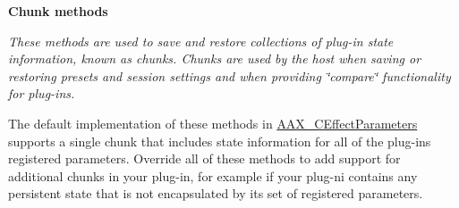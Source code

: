 \begin{Indent}{\bf Chunk methods}\par
{\em These methods are used to save and restore collections of plug-\/in state information, known as chunks. Chunks are used by the host when saving or restoring presets and session settings and when providing \char`\"{}compare\char`\"{} functionality for plug-\/ins.

The default implementation of these methods in \hyperlink{a00018}{A\+A\+X\+\_\+\+C\+Effect\+Parameters} supports a single chunk that includes state information for all of the plug-\/in\textquotesingle{}s registered parameters. Override all of these methods to add support for additional chunks in your plug-\/in, for example if your plug-\/ni contains any persistent state that is not encapsulated by its set of registered parameters.

}
\end{Indent}
